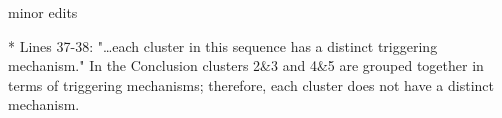\documentclass[10pt]{extarticle}
\begin{document}
\begin{Answer}
 \WorkInProgressRevTask
\end{Answer}
%
%


minor edits

\begin{ReviewerComment}{1}
\noindent 
*        Lines 37-38: "…each cluster in this sequence has a distinct triggering mechanism." In the Conclusion clusters 2\&3 and 4\&5 are grouped together in terms of triggering mechanisms; therefore, each cluster does not have a distinct mechanism.  

\end{ReviewerComment}


\begin{Answer}
 \WorkInProgressRevTask
\end{Answer}
%
%



\begin{ReviewerComment}{1}
\noindent 

\end{ReviewerComment}


\begin{Answer}
 \WorkInProgressRevTask
\end{Answer}
%
%



\begin{ReviewerComment}{1}
\noindent 

\end{ReviewerComment}


\begin{Answer}
 \WorkInProgressRevTask
\end{Answer}
%
%



\begin{ReviewerComment}{1}
\noindent 

\end{ReviewerComment}


\begin{Answer}
 \WorkInProgressRevTask
\end{Answer}
%
%



\begin{ReviewerComment}{1}
\noindent 

\end{ReviewerComment}


\begin{Answer}
 \WorkInProgressRevTask
\end{Answer}
%
%
\end{document}
